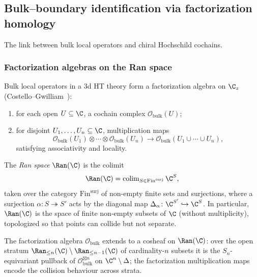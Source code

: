 \subsection{Bulk--boundary identification via factorization homology}

The link between bulk local operators and chiral Hochschild cochains.

\subsubsection{Factorization algebras on the Ran space}

Bulk local operators in a 3d HT theory form a factorization algebra on $\C_z$ (Costello--Gwilliam~\cite{CG17}):

\begin{enumerate}[label=(\roman*)]
\item for each open $U \subseteq \C$, a cochain complex $\mathcal{O}_{\text{bulk}}(U)$;
\item for disjoint $U_1, \ldots, U_n \subseteq \C$, multiplication maps
\begin{equation}
\mathcal{O}_{\text{bulk}}(U_1) \otimes \cdots \otimes \mathcal{O}_{\text{bulk}}(U_n) \longrightarrow \mathcal{O}_{\text{bulk}}(U_1 \cup \cdots \cup U_n),
\end{equation}
satisfying associativity and locality.
\end{enumerate}

\begin{definition}
\label{def:Ran_space}
The \emph{Ran space} $\Ran(\C)$ is the colimit
\begin{equation}
\Ran(\C) = \operatorname{colim}_{S \in \mathrm{Fin}^{\mathrm{surj}}} \C^S,
\end{equation}
taken over the category $\mathrm{Fin}^{\mathrm{surj}}$ of non-empty finite sets and surjections, where a surjection $\alpha\colon S\twoheadrightarrow S'$ acts by the diagonal map $\Delta_\alpha\colon \C^{S'}\hookrightarrow \C^{S}$. In particular, $\Ran(\C)$ is the space of finite non-empty subsets of $\C$ (without multiplicity), topologized so that points can collide but not separate.
\end{definition}

The factorization algebra $\mathcal{O}_{\text{bulk}}$ extends to a cosheaf on $\Ran(\C)$: over the open stratum $\Ran_{\leq n}(\C) \setminus \Ran_{\leq n-1}(\C)$ of cardinality-$n$ subsets it is the $S_n$-equivariant pullback of $\mathcal{O}_{\text{bulk}}^{\boxtimes n}$ on $\C^n \setminus \Delta$; the factorization multiplication maps encode the collision behaviour across strata.

